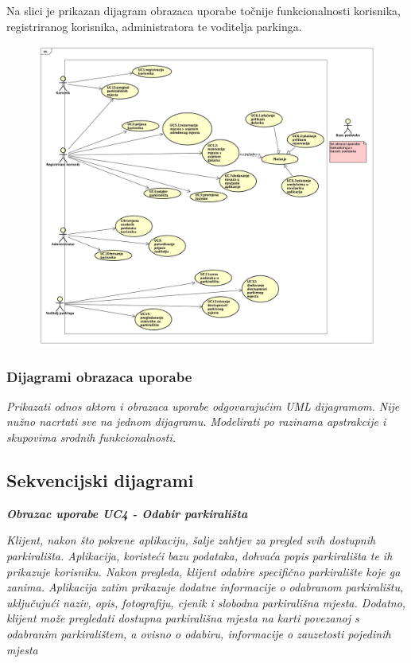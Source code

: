 			{ Na slici je prikazan dijagram obrazaca uporabe točnije funkcionalnosti korisnika, registriranog korisnika, administratora te voditelja parkinga. }
			
			\begin{figure}[h]
				\centering
				\includegraphics[width=\textwidth,keepaspectratio]{slike/spotPicker.png}
			\end{figure}
			\pagebreak
				

					
				\subsubsection{Dijagrami obrazaca uporabe}
					
					\textit{Prikazati odnos aktora i obrazaca uporabe odgovarajućim UML dijagramom. Nije nužno nacrtati sve na jednom dijagramu. Modelirati po razinama apstrakcije i skupovima srodnih funkcionalnosti.}
				\eject		
				
			\subsection{Sekvencijski dijagrami}
				
				 \textbf{\textit{Obrazac uporabe UC4 - Odabir parkirališta}}
				  
				
				 \textit{Klijent, nakon što pokrene aplikaciju, šalje zahtjev za pregled svih dostupnih parkirališta. Aplikacija, koristeći bazu podataka, dohvaća popis parkirališta te ih prikazuje korisniku. Nakon pregleda, klijent odabire specifično parkiralište koje ga zanima. Aplikacija zatim prikazuje dodatne informacije o odabranom parkiralištu, uključujući naziv, opis, fotografiju, cjenik i slobodna parkirališna mjesta. Dodatno, klijent može pregledati dostupna parkirališna mjesta na karti povezanoj s odabranim parkiralištem, a ovisno o odabiru, informacije o zauzetosti pojedinih mjesta}
				    
